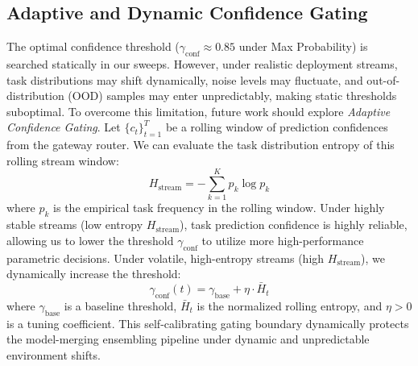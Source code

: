 \documentclass{article}
\theoremstyle{plain}
\theoremstyle{definition}
\theoremstyle{remark}
\begin{document}
\subsection{Adaptive and Dynamic Confidence Gating}
The optimal confidence threshold ($\gamma_{\text{conf}} \approx 0.85$ under Max Probability) is searched statically in our sweeps. However, under realistic deployment streams, task distributions may shift dynamically, noise levels may fluctuate, and out-of-distribution (OOD) samples may enter unpredictably, making static thresholds suboptimal. To overcome this limitation, future work should explore \emph{Adaptive Confidence Gating}. 
Let $\{c_t\}_{t=1}^T$ be a rolling window of prediction confidences from the gateway router. We can evaluate the task distribution entropy of this rolling stream window:
\begin{equation}
H_{\text{stream}} = -\sum_{k=1}^K p_k \log p_k
\end{equation}
where $p_k$ is the empirical task frequency in the rolling window. Under highly stable streams (low entropy $H_{\text{stream}}$), task prediction confidence is highly reliable, allowing us to lower the threshold $\gamma_{\text{conf}}$ to utilize more high-performance parametric decisions. Under volatile, high-entropy streams (high $H_{\text{stream}}$), we dynamically increase the threshold:
\begin{equation}
\gamma_{\text{conf}}(t) = \gamma_{\text{base}} + \eta \cdot \bar{H}_t
\end{equation}
where $\gamma_{\text{base}}$ is a baseline threshold, $\bar{H}_t$ is the normalized rolling entropy, and $\eta > 0$ is a tuning coefficient. This self-calibrating gating boundary dynamically protects the model-merging ensembling pipeline under dynamic and unpredictable environment shifts.
\end{document}
